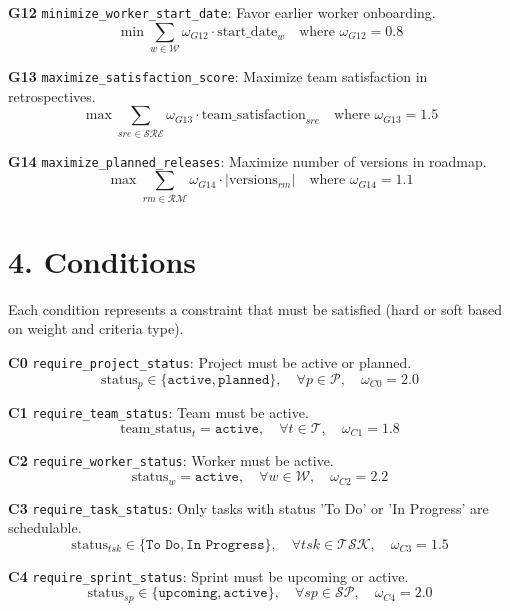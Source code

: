 \documentclass[12pt]{article}
\begin{document}
    \item[\textbf{G12}] \texttt{minimize\_worker\_start\_date}: Favor earlier worker onboarding.
    \[
    \min \sum_{w \in \mathcal{W}} \omega_{G12} \cdot \text{start\_date}_w \quad \text{where } \omega_{G12} = 0.8
    \]

    \item[\textbf{G13}] \texttt{maximize\_satisfaction\_score}: Maximize team satisfaction in retrospectives.
    \[
    \max \sum_{sre \in \mathcal{SRE}} \omega_{G13} \cdot \text{team\_satisfaction}_{sre} \quad \text{where } \omega_{G13} = 1.5
    \]

    \item[\textbf{G14}] \texttt{maximize\_planned\_releases}: Maximize number of versions in roadmap.
    \[
    \max \sum_{rm \in \mathcal{RM}} \omega_{G14} \cdot |\text{versions}_{rm}| \quad \text{where } \omega_{G14} = 1.1
    \]

\section{4. Conditions}
Each condition represents a constraint that must be satisfied (hard or soft based on weight and criteria type).

\item[\textbf{C0}] \texttt{require\_project\_status}: Project must be active or planned.
    \[
    \text{status}_p \in \{\texttt{active}, \texttt{planned}\}, \quad \forall p \in \mathcal{P}, \quad \omega_{C0} = 2.0
    \]

    \item[\textbf{C1}] \texttt{require\_team\_status}: Team must be active.
    \[
    \text{team\_status}_t = \texttt{active}, \quad \forall t \in \mathcal{T}, \quad \omega_{C1} = 1.8
    \]

    \item[\textbf{C2}] \texttt{require\_worker\_status}: Worker must be active.
    \[
    \text{status}_w = \texttt{active}, \quad \forall w \in \mathcal{W}, \quad \omega_{C2} = 2.2
    \]

    \item[\textbf{C3}] \texttt{require\_task\_status}: Only tasks with status 'To Do' or 'In Progress' are schedulable.
    \[
    \text{status}_{tsk} \in \{\texttt{To Do}, \texttt{In Progress}\}, \quad \forall tsk \in \mathcal{TSK}, \quad \omega_{C3} = 1.5
    \]

    \item[\textbf{C4}] \texttt{require\_sprint\_status}: Sprint must be upcoming or active.
    \[
    \text{status}_{sp} \in \{\texttt{upcoming}, \texttt{active}\}, \quad \forall sp \in \mathcal{SP}, \quad \omega_{C4} = 2.0
    \]
\end{document}

